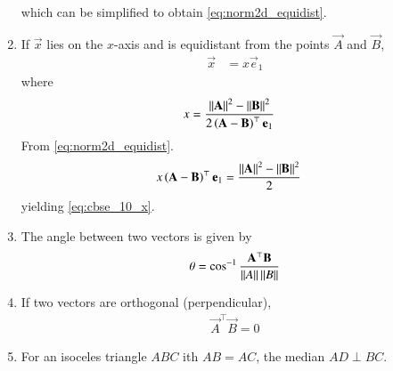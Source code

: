 \begin{enumerate}[label=\thesection.\arabic*.,ref=\thesection.\theenumi]
which can be simplified to obtain
  \eqref{eq:norm2d_equidist}.
\item If $\vec{x}$ lies on the  $x$-axis and is  equidistant from the points $\vec{A}$ and $\vec{B}$, 
  \begin{align}
	  \vec{x} &=
	   x\vec{e}_1
  \end{align}
  where 
  \begin{align}
	  x &=\frac{\left\lVert\mathbf{A}\right\rVert^2 -\left\lVert\mathbf{B}\right\rVert^2 }{2\left(\mathbf{A}-\mathbf{B}\right)^{\top }\mathbf{e}_1
}
	  \label{eq:cbse_10_x}
  \end{align}
  \solution 
  From \eqref{eq:norm2d_equidist}.
  \begin{align}
	   x\left(\mathbf{A}-\mathbf{B}\right)^{\top }\mathbf{e}_1
		  &=
	  \frac{\left\lVert\mathbf{A}\right\rVert^2 -\left\lVert\mathbf{B}\right\rVert^2 }{2}
   \end{align}
	  yielding \eqref{eq:cbse_10_x}.
  \item The angle between two vectors is given by 
    \label{prop:angle2d}
  \begin{align}
    \theta = \cos^{-1}\frac{\mathbf{A}^{\top} \mathbf{B}}{\left\lVert A\right\rVert\left\lVert B\right\rVert}
  \end{align}
  \item If two vectors are orthogonal (perpendicular), 
  \begin{align}
    \label{eq:angle2d_orth}
\vec{A}^{\top} \vec{B} = 0
  \end{align}
  \item For an isoceles triangle $ABC$ ith $AB = AC$, the median $AD \perp BC$.
    \label{prop:two-isosc}


\end{enumerate}
